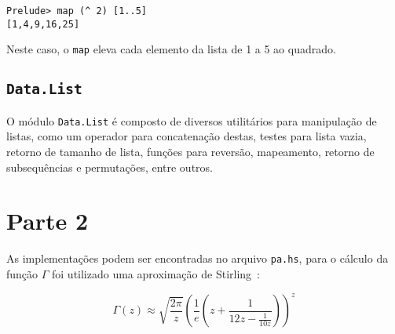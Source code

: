 \documentclass[a4paper,twocolumn,10pt]{article}
\begin{document}
\begin{verbatim}
Prelude> map (^ 2) [1..5]
[1,4,9,16,25]
\end{verbatim}

Neste caso, o \texttt{map} eleva cada elemento da lista de 1 a 5 ao quadrado.

\subsection*{\texttt{Data.List}}

O módulo \texttt{Data.List} é composto de diversos utilitários para manipulação
de listas, como um operador para concatenação destas, testes para lista vazia,
retorno de tamanho de lista, funções para reversão, mapeamento, retorno de
subsequências e permutações, entre outros.

\section*{Parte 2}

As implementações podem ser encontradas no arquivo \verb|pa.hs|, para o cálculo
da função $\Gamma$ foi utilizado uma aproximação de Stirling~\cite{Nemes2010}:

\[
\Gamma(z) \approx \sqrt{\frac{2\pi}{z}}
\left( \frac{1}{e} \left( z + \frac{1}{12z - \frac{1}{10z}} \right) \right) ^z
\]

\footnotesize 

\end{document}
